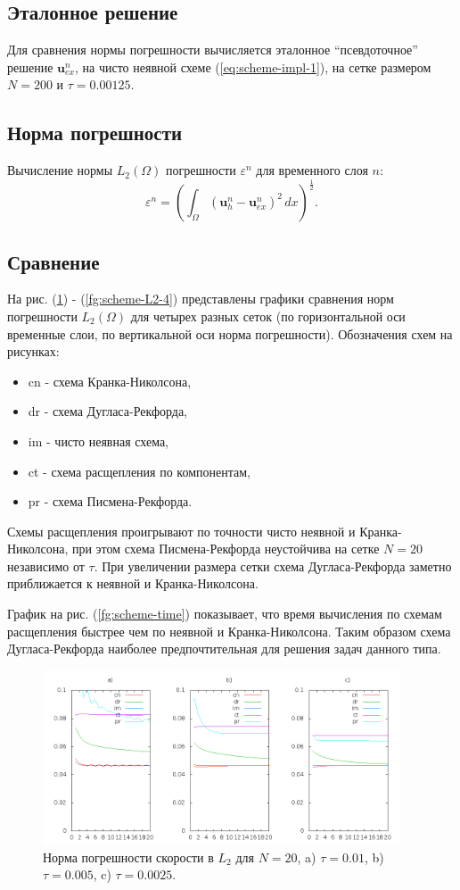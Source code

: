 \documentclass[12pt]{article}
\begin{document}
\subsection{Эталонное решение}
Для сравнения нормы погрешности вычисляется эталонное ``псевдоточное'' решение ${\bm u}_{ex}^n$, на чисто неявной схеме (\ref{eq:scheme-impl-1}), на сетке размером $N=200$ и $\tau=0.00125$.

\subsection{Норма погрешности}
Вычисление нормы $L_2(\Omega)$ погрешности $\varepsilon^n$ для временного слоя $n$:
$$
\varepsilon^n = \left(\int_{\Omega} ({\bm u}_h^n - {\bm u}_{ex}^n )^2 \, dx\right)^{\frac{1}{2}}.
$$

\subsection{Сравнение}
На рис. (\ref{fg:scheme-L2-1}) - (\ref{fg:scheme-L2-4}) представлены графики сравнения норм погрешности $L_2(\Omega)$  для четырех разных сеток (по горизонтальной оси временные слои, по вертикальной оси норма погрешности). Обозначения схем на рисунках:
\begin{itemize}
\item cn - схема Кранка-Николсона,
\item dr - схема Дугласа-Рекфорда,
\item im - чисто неявная схема,
\item ct - схема расщепления по компонентам,
\item pr - схема Писмена-Рекфорда.
\end{itemize}



Схемы расщепления проигрывают по точности чисто неявной и Кранка-Николсона, при этом  схема Писмена-Рекфорда неустойчива на сетке $N=20$ независимо от $\tau$. При увеличении размера сетки схема Дугласа-Рекфорда заметно приближается к неявной и Кранка-Николсона.

График на рис. (\ref{fg:scheme-time}) показывает, что время вычисления по схемам расщепления быстрее чем по неявной и Кранка-Николсона. Таким образом схема Дугласа-Рекфорда наиболее предпочтительная для решения задач данного типа.

\begin{figure}
	\begin{center}
		\includegraphics[width=400px]{data160/error_1}
		\caption{Норма погрешности скорости в $L_2$ для $N=20$, a) $\tau=0.01$, b) $\tau=0.005$, c) $\tau=0.0025$.}
		\label{fg:scheme-L2-1}
	\end{center}
\end{figure}
\end{document}

